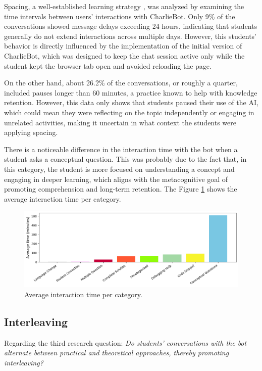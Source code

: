 \documentclass[a4paper,twoside]{article}
\begin{document}
Spacing, a well-established learning strategy \citep{Carvalho20}, was analyzed
by examining the time intervals between users' interactions with CharlieBot.
Only 9\% of the conversations showed message delays exceeding 24 hours,
indicating that students generally do not extend interactions across multiple
days. However, this students' behavior is directly influenced by the
implementation of the initial version of CharlieBot, which was designed to keep
the chat session active only while the student kept the browser tab open and
avoided reloading the page.

On the other hand, about 26.2\% of the conversations, or roughly a quarter,
included pauses longer than 60 minutes, a practice known to help with knowledge
retention. However, this data only shows that students paused their use of the
AI, which could mean they were reflecting on the topic independently or engaging
in unrelated activities, making it uncertain in what context the students were
applying spacing.

There is a noticeable difference in the interaction time with the bot when a
student asks a conceptual question. This was probably due to the fact that, in
this category, the student is more focused on understanding a concept and
engaging in deeper learning, which aligns with the metacognitive goal of
promoting comprehension and long-term retention. The Figure \ref{fig:graph3}
shows the average interaction time per category.

\begin{figure}[htbp]
  \centering
  \includegraphics[scale=0.55]{img/figure3.png}
  \caption{Average interaction time per category.}
  \label{fig:graph3}
\end{figure}

\subsection{Interleaving}


Regarding the third research question: \textit{Do students' conversations with
the bot alternate between practical and theoretical approaches, thereby
promoting interleaving?}
\end{document}
